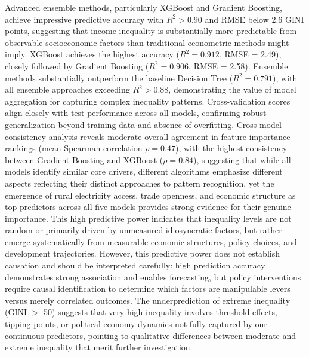 \documentclass[10pt,twocolumn]{article}
\begin{document}
\par Advanced ensemble methods, particularly XGBoost and Gradient Boosting, achieve impressive predictive accuracy with $R^2 > 0.90$ and RMSE below 2.6 GINI points, suggesting that income inequality is substantially more predictable from observable socioeconomic factors than traditional econometric methods might imply. XGBoost achieves the highest accuracy ($R^2 = 0.912$, RMSE = 2.49), closely followed by Gradient Boosting ($R^2 = 0.906$, RMSE = 2.58). Ensemble methods substantially outperform the baseline Decision Tree ($R^2 = 0.791$), with all ensemble approaches exceeding $R^2 > 0.88$, demonstrating the value of model aggregation for capturing complex inequality patterns. Cross-validation scores align closely with test performance across all models, confirming robust generalization beyond training data and absence of overfitting. Cross-model consistency analysis reveals moderate overall agreement in feature importance rankings (mean Spearman correlation $\rho = 0.47$), with the highest consistency between Gradient Boosting and XGBoost ($\rho = 0.84$), suggesting that while all models identify similar core drivers, different algorithms emphasize different aspects reflecting their distinct approaches to pattern recognition, yet the emergence of rural electricity access, trade openness, and economic structure as top predictors across all five models provides strong evidence for their genuine importance. This high predictive power indicates that inequality levels are not random or primarily driven by unmeasured idiosyncratic factors, but rather emerge systematically from measurable economic structures, policy choices, and development trajectories. However, this predictive power does not establish causation and should be interpreted carefully: high prediction accuracy demonstrates strong association and enables forecasting, but policy interventions require causal identification to determine which factors are manipulable levers versus merely correlated outcomes. The underprediction of extreme inequality (GINI $>$ 50) suggests that very high inequality involves threshold effects, tipping points, or political economy dynamics not fully captured by our continuous predictors, pointing to qualitative differences between moderate and extreme inequality that merit further investigation.
\end{document}
